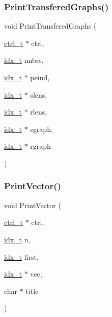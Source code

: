 \subsubsection{\texorpdfstring{Print\+Transfered\+Graphs()}{PrintTransferedGraphs()}}
{\footnotesize\ttfamily void Print\+Transfered\+Graphs (\begin{DoxyParamCaption}\item[{\hyperlink{a00742}{ctrl\+\_\+t} $\ast$}]{ctrl,  }\item[{\hyperlink{a00876_aaa5262be3e700770163401acb0150f52}{idx\+\_\+t}}]{nnbrs,  }\item[{\hyperlink{a00876_aaa5262be3e700770163401acb0150f52}{idx\+\_\+t} $\ast$}]{peind,  }\item[{\hyperlink{a00876_aaa5262be3e700770163401acb0150f52}{idx\+\_\+t} $\ast$}]{slens,  }\item[{\hyperlink{a00876_aaa5262be3e700770163401acb0150f52}{idx\+\_\+t} $\ast$}]{rlens,  }\item[{\hyperlink{a00876_aaa5262be3e700770163401acb0150f52}{idx\+\_\+t} $\ast$}]{sgraph,  }\item[{\hyperlink{a00876_aaa5262be3e700770163401acb0150f52}{idx\+\_\+t} $\ast$}]{rgraph }\end{DoxyParamCaption})}

\mbox{\label{a00885_a43a186cb2cde8ebcf85b11b5c3ac0f6c}} 
\subsubsection{\texorpdfstring{Print\+Vector()}{PrintVector()}}
{\footnotesize\ttfamily void Print\+Vector (\begin{DoxyParamCaption}\item[{\hyperlink{a00742}{ctrl\+\_\+t} $\ast$}]{ctrl,  }\item[{\hyperlink{a00876_aaa5262be3e700770163401acb0150f52}{idx\+\_\+t}}]{n,  }\item[{\hyperlink{a00876_aaa5262be3e700770163401acb0150f52}{idx\+\_\+t}}]{first,  }\item[{\hyperlink{a00876_aaa5262be3e700770163401acb0150f52}{idx\+\_\+t} $\ast$}]{vec,  }\item[{char $\ast$}]{title }\end{DoxyParamCaption})}

